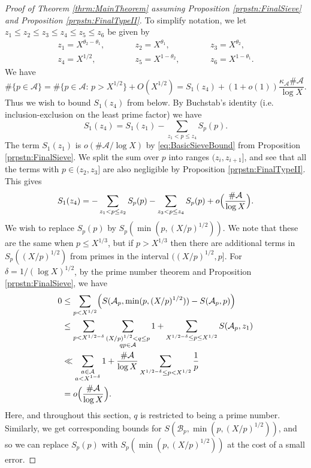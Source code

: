 \documentclass[10pt]{amsart}
\theoremstyle{plain}
\numberwithin{sblmm}{thrm}
\numberwithin{equation}{section}
\begin{document}
\begin{proof}[Proof of Theorem \ref{thrm:MainTheorem} assuming Proposition \ref{prpstn:FinalSieve} and Proposition \ref{prpstn:FinalTypeII}]
To simplify notation, we let $z_1\le z_2\le z_3\le z_4\le z_5\le z_6$ be given by
%
\begin{align*}
&z_1=X^{\theta_2-\theta_1},&\qquad &z_2=X^{\theta_1},&\qquad &z_3=X^{\theta_2},\\
&z_4=X^{1/2},&\qquad &z_5=X^{1-\theta_2},&\qquad &z_6=X^{1-\theta_1}.&
\end{align*}
%
We have
\[
\#\{p\in\mathcal{A}{}\}=\#\{p\in\mathcal{A}{}:\,p>X^{1/2}\}+O(X^{1/2})=S_1(z_4)+(1+o(1))\frac{\kappa_{\mathcal{A}}\#\mathcal{A}{}}{\log{X}}.
\]
Thus we wish to bound $S_1(z_4)$ from below. By Buchstab's identity (i.e. inclusion-exclusion on the least prime factor) we have
\[
S_1(z_4)=S_1(z_1)-\sum_{z_1<p\le z_4}S_p(p).
\]
The term $S_1(z_1)$ is $o(\#\mathcal{A}{}/\log{X})$ by \eqref{eq:BasicSieveBound} from Proposition \ref{prpstn:FinalSieve}. We split the sum over $p$ into ranges $(z_i,z_{i+1}]$, and see that all the terms with $p\in (z_2,z_3]$ are also negligible by Proposition \ref{prpstn:FinalTypeII}. This gives
\[
S_1(z_4)
=-\sum_{z_1<p\le z_2}S_p(p)
-\sum_{z_3<p\le z_4}S_p(p)
+o\Bigl(\frac{\#\mathcal{A}{}}{\log{X}}\Bigr).
\]
%
We wish to replace $S_p(p)$ by $S_p(\min(p,(X/p)^{1/2}))$. We note that these are the same when $p\le X^{1/3}$, but if $p>X^{1/3}$ then there are additional terms in $S_p((X/p)^{1/2})$ from primes in the interval $((X/p)^{1/2},p]$. For $\delta=1/(\log{X})^{1/2}$, by the prime number theorem and Proposition \ref{prpstn:FinalSieve}, we have
\begin{align}
0&\le\sum_{p<X^{1/2}}\Bigl(S(\mathcal{A}{}_p,\min(p,(X/p)^{1/2}))-S(\mathcal{A}{}_p,p)\Bigr)\nonumber\\
&\le\sum_{p<X^{1/2-\delta}}\sum_{\substack{(X/p)^{1/2}<q\le p\\ q p\in\mathcal{A}{}}}1+\sum_{X^{1/2-\delta}\le p\le X^{1/2}}S(\mathcal{A}{}_p,z_1)\nonumber\\
&\ll \sum_{\substack{a\in\mathcal{A}{}\\ a<X^{1-\delta} }}1+\frac{\#\mathcal{A}{}}{\log{X}}\sum_{X^{1/2-\delta}\le p<X^{1/2}}\frac{1}{p}\nonumber\\
&=o\Bigl(\frac{\#\mathcal{A}{}}{\log{X}}\Bigr).\label{eq:FactorReduction}
\end{align}
Here, and throughout this section, $q$ is restricted to being a prime number. Similarly, we get corresponding bounds for $S(\mathcal{B}{}_p,\min(p,(X/p)^{1/2}))$, and so we can replace $S_p(p)$ with $S_p(\min(p,(X/p)^{1/2}))$ at the cost of a small error. 


\end{proof}
\end{document}
